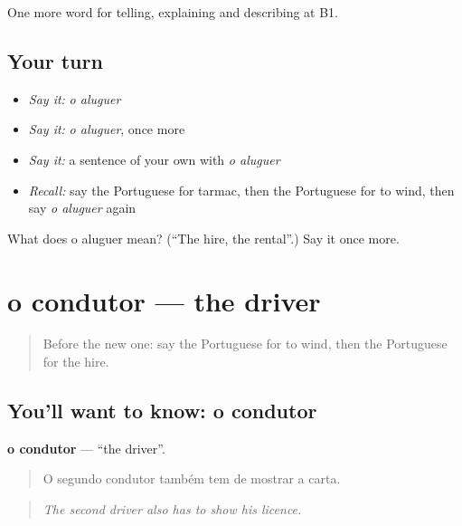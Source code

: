 \begin{grammarlens}[title={What you've built}]
One more word for telling, explaining and describing at B1.
\end{grammarlens}

\subsection*{Your turn}
\begin{itemize}
\raggedright
  \item \emph{Say it:} \emph{o aluguer}
  \item \emph{Say it:} \emph{o aluguer}, once more
  \item \emph{Say it:} a sentence of your own with \emph{o aluguer}
  \item \emph{Recall:} say the Portuguese for tarmac, then the Portuguese for to wind, then say \emph{o aluguer} again
\end{itemize}

\begin{tcolorbox}[breakable,colback=teal!4,colframe=teal!35!black,title={Before you move on}]
What does o aluguer mean? (\textquotedblleft{}The hire, the rental\textquotedblright{}.) Say it once more.
\end{tcolorbox}
\section[o condutor]{o condutor — the driver}

\label{lesson:PT-C411-condutor}



\begin{quote}
Before the new one: say the Portuguese for to wind, then the Portuguese for the hire.
\end{quote}

\subsection*{You'll want to know: o condutor}
\textbf{o condutor} — \textquotedblleft{}the driver\textquotedblright{}.

\begin{quote}
O segundo condutor também tem de mostrar a carta.
\end{quote}

\begin{quote}
\emph{The second driver also has to show his licence.}
\end{quote}

